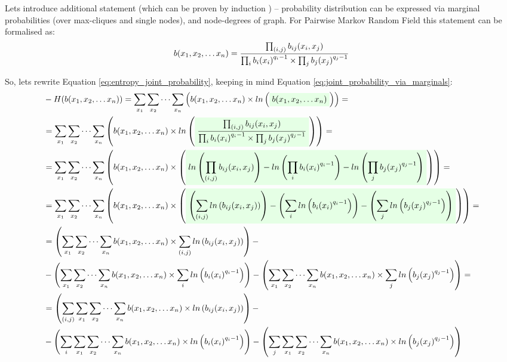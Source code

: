 \documentclass[fleqn,leqno]{article}
\newcommand{\highlight}[1]{\colorbox{green!10}{$\displaystyle#1$}}
\begin{document}
Lets introduce additional statement \cite{bethe_free_energy_kikuch_approximations_and_bp} (which can be proven by induction \cite{a_montanari_inference_in_graphical_models}) -- probability distribution can be expressed via marginal probabilities (over max-cliques and single nodes), and node-degrees of graph. For Pairwise Markov Random Field this statement can be formalised as:
\begin{equation} \label{eq:joint_probability_via_marginals}
b(x_1, x_2, \dots x_n) = {\prod_{(i, j)} b_{ij}(x_i, x_j) \over \prod_i {b_i(x_i)}^{q_i - 1} \times \prod_j {b_j(x_j)}^{q_j - 1}}
\end{equation}

So, lets rewrite Equation \eqref{eq:entropy_joint_probability}, keeping in mind Equation \eqref{eq:joint_probability_via_marginals}:
\begin{equation}
\begin{split}
  & -H(b(x_1,x_2,\dots x_n)) = \sum_{x_1} \sum_{x_2} \cdots \sum_{x_n} \left( b(x_1, x_2, \dots x_n) \times ln \left( \highlight{b(x_1, x_2, \dots x_n)} \right) \right) = \\
  & = \sum_{x_1} \sum_{x_2} \cdots \sum_{x_n} \left( b(x_1, x_2, \dots x_n) \times ln \left( \highlight{{\prod_{(i, j)} b_{ij}(x_i, x_j) \over \prod_i {b_i(x_i)}^{q_i - 1} \times \prod_j {b_j(x_j)}^{q_j - 1}}} \right) \right) = \\
  & = \sum_{x_1} \sum_{x_2} \cdots \sum_{x_n} \left( b(x_1, x_2, \dots x_n) \times \left( \highlight{ ln \left( \prod_{(i, j)} b_{ij}(x_i, x_j) \right) - ln \left( \prod_i {b_i(x_i)}^{q_i - 1} \right) - ln \left( \prod_j {b_j(x_j)}^{q_j - 1} \right)} \right) \right) = \\
  & = \sum_{x_1} \sum_{x_2} \cdots \sum_{x_n} \left( b(x_1, x_2, \dots x_n) \times \left( \highlight{ \left( \sum_{(i, j)} ln \left( b_{ij}(x_i, x_j) \right) \right) - \left( \sum_i ln \left({b_i(x_i)}^{q_i - 1}\right) \right) - \left( \sum_j ln \left({b_j(x_j)}^{q_j - 1}\right) \right)} \right) \right) = \\
  & = \left( \sum_{x_1} \sum_{x_2} \cdots \sum_{x_n} b(x_1, x_2, \dots x_n) \times \sum_{(i, j)} ln \left( b_{ij}(x_i, x_j) \right) \right) - \\
  & -\left( \sum_{x_1} \sum_{x_2} \cdots \sum_{x_n} b(x_1, x_2, \dots x_n) \times \sum_i ln \left({b_i(x_i)}^{q_i - 1}\right) \right) - \left( \sum_{x_1} \sum_{x_2} \cdots \sum_{x_n} b(x_1, x_2, \dots x_n) \times \sum_j ln \left({b_j(x_j)}^{q_j - 1}\right) \right) = \\
  & = \left( \sum_{(i, j)} \sum_{x_1} \sum_{x_2} \cdots \sum_{x_n} b(x_1, x_2, \dots x_n) \times ln \left( b_{ij}(x_i, x_j) \right) \right) - \\
  & -\left( \sum_i \sum_{x_1} \sum_{x_2} \cdots \sum_{x_n} b(x_1, x_2, \dots x_n) \times ln \left({b_i(x_i)}^{q_i - 1}\right) \right) - \left( \sum_j \sum_{x_1} \sum_{x_2} \cdots \sum_{x_n} b(x_1, x_2, \dots x_n) \times ln \left({b_j(x_j)}^{q_j - 1}\right) \right)
\end{split}
\end{equation}
\end{document}
